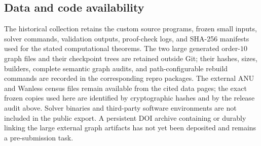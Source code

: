 \subsection*{Data and code availability}
The historical collection retains the custom source programs, frozen small
inputs, solver commands, validation outputs, proof-check logs, and SHA-256
manifests used for the stated computational theorems.  The two large generated
order-$10$ graph files and their checkpoint trees are retained outside Git;
their hashes, sizes, builders, complete semantic graph audits, and path-configurable
rebuild commands are recorded in the corresponding repro packages.  The
external ANU and Wanless census files remain available from the cited data
pages; the exact frozen copies used here are identified by cryptographic
hashes and by the release audit above.  Solver binaries and third-party software environments are not included in the public export.  A
persistent DOI archive containing or durably linking the large external graph
artifacts has not yet been deposited and remains a pre-submission task.
